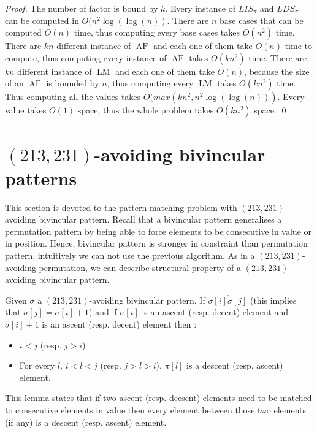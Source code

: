 \documentclass[a4paper]{llncs}
\newcommand{\ptext}{\pi}
\newcommand{\ppattern}{\sigma}
\newcounter{num}
\DeclareMathOperator{\LMa}{LM}
\DeclareMathOperator{\AFa}{AF}
\begin{document}
\begin{proof}
The number of factor is bound by $k$.
Every instance of $LIS_{\ptext}$ and $LDS_{\ptext}$ can be computed in $O(n^2\log(\log(n))$.
There are $n$ base cases that can be computed $O(n)$ time, thus computing every base cases
takes $O(n^2)$ time.
There are $kn$ different instance of $\AFa$ and each one of them take $O(n)$ time to compute, 
thus computing every instance of $\AFa$ takes $O(kn^2)$ time.
There are $kn$ different instance of $\LMa$ and each one of them take $O(n)$, because the size of an $\AFa$
is bounded by $n$, thus computing every $\LMa$ takes $O(kn^2)$ time.
Thus computing all the values takes $O(max(kn^2,n^2\log(\log(n)))$.
Every value takes $O(1)$ space, thus the whole problem takes $O(kn^2)$ space.
\qed
\end{proof}


\section{$(213,231)$-avoiding bivincular patterns}
	\label{section:bivincular}

This section is devoted to the pattern matching problem with $(213,231)$-avoiding bivincular pattern.
Recall that a bivincular pattern generalises a permutation pattern by
being able to force elements to be consecutive in value or in position.
Hence,  bivincular pattern is stronger in constraint than permutation pattern, intuitively we can not use the previous algorithm.
As in a $(213,231)$-avoiding permutation, we can describe structural property of a $(213,231)$-avoiding bivincular pattern.

\begin{lemma}
\label{lemma:ascentDescentAscent}
Given $\ppattern$ a $(213,231)$-avoiding bivincular pattern,
If $\overline{\sigma[i]\sigma[j]}$ (this implies that $\sigma[j]=\sigma[i]+1$) and 
if $\sigma[i]$ is an ascent (resp. decent) element and $\sigma[i]+1$ is an ascent 
(resp. decent) element then :  
\begin{itemize}
	\item $i<j$ (resp. $j>i$)
	\item For every $l$, $i<l<j$ (resp. $j>l>i$), $\pi[l]$ is a descent (resp. ascent) element.    
\end{itemize}
\end{lemma}

This lemma states that if two ascent (resp. decsent) elements
need to be matched to consecutive elements in value then every element between those two elements (if any) is a descent (resp. ascent) element. 
\end{document}
